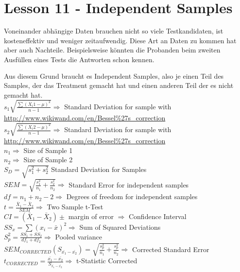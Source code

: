\documentclass[landscape]{article}
\begin{document}
	\section{Lesson 11 - Independent Samples}
		Voneinander abhängige Daten brauchen nicht so viele Testkandidaten, ist kosteneffektiv und weniger zeitaufwendig. Diese Art an Daten zu kommen hat aber auch Nachteile. Beispielsweise könnten die Probanden beim zweiten Ausfüllen eines Tests die Antworten schon kennen.

		Aus diesem Grund braucht es Independent Samples, also je einen Teil des Samples, der das Treatment gemacht hat und einen anderen Teil der es nicht gemacht hat.
		\\\(s_1 \sqrt{\frac{\sum{(X_i1 - \mu)^2}}{n - 1}} \Rightarrow\) Standard Deviation for sample with
		 \href{Bessel\'s correction}{http://www.wikiwand.com/en/Bessel\%27s\_correction}
		\\\(s_2 \sqrt{\frac{\sum{(X_i2 - \mu)^2}}{n - 1}} \Rightarrow\) Standard Deviation for sample with \href{Bessel\'s correction}{http://www.wikiwand.com/en/Bessel\%27s\_correction}
		\\\(n_1 \Rightarrow\) Size of Sample 1
		\\\(n_2 \Rightarrow\) Size of Sample 2
		\\\(S_D = \sqrt{s_1^2 + s_2^2}\) Standard Deviation for Samples
		\\\(SEM = \sqrt{\frac{s_1^2}{n_1} + \frac{s_2^2}{n_2}} \Rightarrow\) Standard Error for independent samples
		\\\(df = n_1 + n_2 - 2 \Rightarrow\) Degrees of freedom for independent samples
		\\\(t = \frac{\bar{X}_1 - \bar{X}_2}{SEM} \Rightarrow\) Two Sample t-Test
		\\\(CI = (\bar{X}_1 - \bar{X}_2) \pm \) margin of error \(\Rightarrow\) Confidence Interval
		\\\(SS_x = \sum{(x_i - \bar{x})^2} \Rightarrow\) Sum of Squared Deviations
		\\\(S_p^2 = \frac{SS_1 + SS_2}{df_1 + df_2} \Rightarrow\) Pooled variance
		\\\(SEM_{CORRECTED} (S_{\bar{x_1} - \bar{x_2}}) = \sqrt{\frac{s_p^2}{n_1} + \frac{s_p^2}{n_2}} \Rightarrow\) Corrected Standard Error
		\\\(t_{CORRECTED} = \frac{\bar{x_1} - \bar{x_2}}{S_{\bar{x_1}-\bar{x_2}}} \Rightarrow\) t-Statistic Corrected
\end{document}
